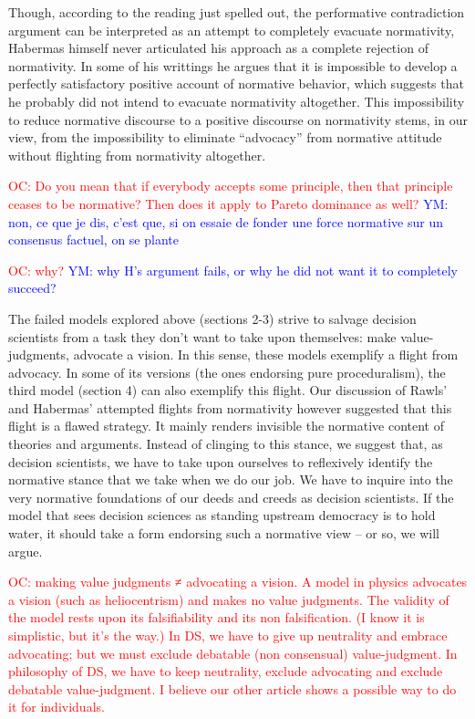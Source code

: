 \documentclass[preprint,11pt]{elsarticle}
\newcommand{\commentYM}[1]{\textcolor{blue}{YM: #1}}
\newcommand{\commentOC}[1]{\textcolor{red}{OC: #1}}
\begin{document}
Though, according to the reading just spelled out, the performative contradiction argument can be interpreted as an attempt to completely evacuate normativity, Habermas himself never articulated his approach as a complete rejection of normativity. In some of his writtings he argues that it is impossible to develop a perfectly satisfactory positive account of normative behavior, which suggests that he probably did not intend to evacuate normativity altogether. This impossibility to reduce normative discourse to a positive discourse on normativity stems, in our view, from the impossibility to eliminate ``advocacy'' from normative attitude without flighting from normativity altogether. 

\commentOC{Do you mean that if everybody
accepts some principle, then that principle ceases to be
normative? Then does it apply to Pareto dominance as well?}
\commentYM{non, ce que je dis, c'est que, si on essaie de fonder une force normative sur un consensus factuel, on se plante}

\commentOC{why?
}
\commentYM{why H's argument fails, or why he did not want it to completely succeed?}

The failed models explored above (sections 2-3) strive to salvage decision scientists from a task they don’t want to take upon themselves: make value-judgments, advocate a vision. In this sense, these models exemplify a flight from advocacy. In some of its versions (the ones endorsing pure proceduralism), the third model (section 4) can also exemplify this flight. Our discussion of Rawls' and Habermas' attempted flights from normativity however suggested that this flight is a flawed strategy. It mainly renders invisible the normative content of theories and arguments. Instead of clinging to this stance, we suggest that, as decision scientists, we have to take upon ourselves to reflexively identify the normative stance that we take when we do our job. We have to inquire into the very normative foundations of our deeds and creeds as decision scientists. If the model that sees decision sciences as standing upstream democracy is to hold water, it should take a form endorsing such a normative view -- or so, we will argue.

\commentOC{making value judgments ≠
advocating a vision. A model in physics advocates a vision
(such as heliocentrism) and makes no value judgments. The
validity of the model rests upon its falsifiability and its non
falsification. (I know it is simplistic, but it’s the way.)
In DS, we have to give up neutrality and embrace
advocating; but we must exclude debatable (non
consensual) value-judgment.
In philosophy of DS, we have to keep neutrality, exclude
advocating and exclude debatable value-judgment. I believe
our other article shows a possible way to do it for
individuals.}
\end{document}

